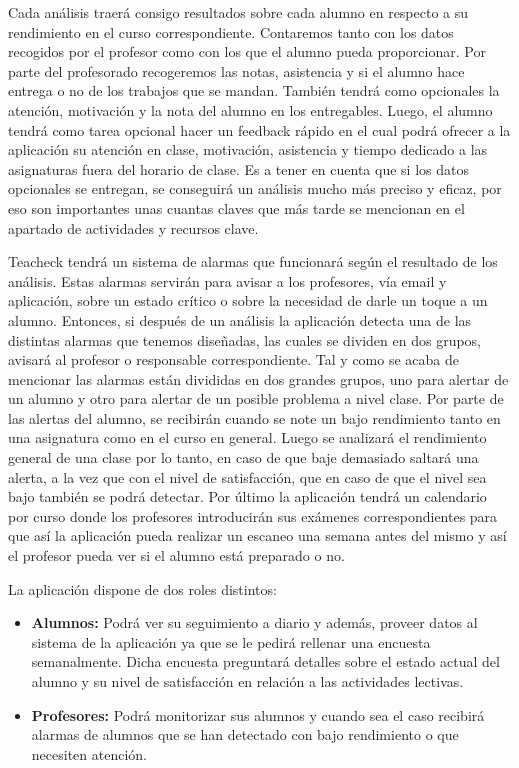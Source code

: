 Cada análisis traerá consigo resultados sobre cada alumno en respecto a su rendimiento en el curso correspondiente. Contaremos tanto con los datos recogidos por el profesor como con los que el alumno pueda proporcionar. Por parte del profesorado recogeremos las notas, asistencia y si el alumno hace entrega o no de los trabajos que se mandan. También tendrá como opcionales la atención, motivación y la nota del alumno en los entregables. Luego, el alumno tendrá como tarea opcional hacer un feedback rápido en el cual podrá ofrecer a la aplicación su atención en clase, motivación, asistencia y tiempo dedicado a las asignaturas fuera del horario de clase. Es a tener en cuenta que si los datos opcionales se entregan, se conseguirá un análisis mucho más preciso y eficaz, por eso son importantes unas cuantas claves que más tarde se mencionan en el apartado de actividades y recursos clave.

Teacheck tendrá un sistema de alarmas que funcionará según el resultado de los análisis. Estas alarmas servirán para avisar a los profesores, vía email y aplicación, sobre un estado crítico o sobre la necesidad de darle un toque a un alumno. Entonces, si después de un análisis la aplicación detecta una de las distintas alarmas que tenemos diseñadas, las cuales se dividen en dos grupos, avisará al profesor o responsable correspondiente. Tal y como se acaba de mencionar las alarmas están divididas en dos grandes grupos, uno para alertar de un alumno y otro para alertar de un posible problema a nivel clase. Por parte de las alertas del alumno, se recibirán cuando se note un bajo rendimiento tanto en una asignatura como en el curso en general. Luego se analizará el rendimiento general de una clase por lo tanto, en caso de que baje demasiado saltará una alerta, a la vez que con el nivel de satisfacción, que en caso de que el nivel sea bajo también se podrá detectar. Por último la aplicación tendrá un calendario por curso donde los profesores introducirán sus exámenes correspondientes para que así la aplicación pueda realizar un escaneo una semana antes del mismo y así el profesor pueda ver si el alumno está preparado o no.

La aplicación dispone de dos roles distintos:
\begin{itemize}
\item \textbf{Alumnos:} Podrá ver su seguimiento a diario y además, proveer datos al sistema de la aplicación ya que se le pedirá rellenar una encuesta semanalmente. Dicha encuesta preguntará detalles sobre el estado actual del alumno y su nivel de satisfacción en relación a las actividades lectivas.  

\item \textbf{Profesores:} Podrá monitorizar sus alumnos y cuando sea el caso recibirá alarmas de alumnos que se han detectado con bajo rendimiento o que necesiten atención.

  
\end{itemize}

